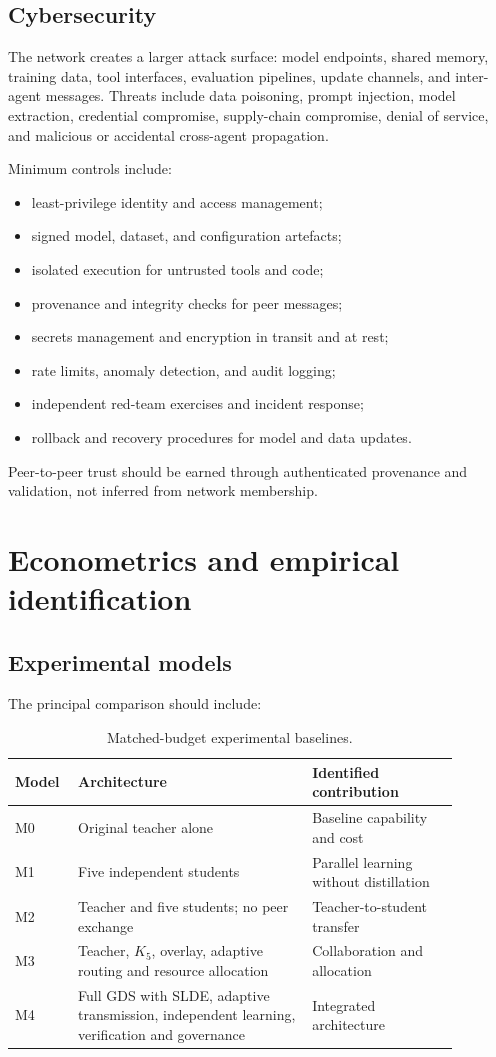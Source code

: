 \documentclass[11pt,a4paper]{article}
\begin{document}
\subsection{Cybersecurity}

The network creates a larger attack surface: model endpoints, shared memory, training data, tool interfaces, evaluation pipelines, update channels, and inter-agent messages. Threats include data poisoning, prompt injection, model extraction, credential compromise, supply-chain compromise, denial of service, and malicious or accidental cross-agent propagation.

Minimum controls include:
\begin{itemize}
\item least-privilege identity and access management;
\item signed model, dataset, and configuration artefacts;
\item isolated execution for untrusted tools and code;
\item provenance and integrity checks for peer messages;
\item secrets management and encryption in transit and at rest;
\item rate limits, anomaly detection, and audit logging;
\item independent red-team exercises and incident response;
\item rollback and recovery procedures for model and data updates.
\end{itemize}
Peer-to-peer trust should be earned through authenticated provenance and validation, not inferred from network membership.

\section{Econometrics and empirical identification}

\subsection{Experimental models}

The principal comparison should include:
\begin{table}[ht]
\centering
\small
\begin{tabular}{p{0.10\linewidth}p{0.48\linewidth}p{0.30\linewidth}}
\toprule
Model & Architecture & Identified contribution\\
\midrule
M0 & Original teacher alone & Baseline capability and cost\\
M1 & Five independent students & Parallel learning without distillation\\
M2 & Teacher and five students; no peer exchange & Teacher-to-student transfer\\
M3 & Teacher, \(K_5\), overlay, adaptive routing and resource allocation & Collaboration and allocation\\
M4 & Full GDS with SLDE, adaptive transmission, independent learning, verification and governance & Integrated architecture\\
\bottomrule
\end{tabular}
\caption{Matched-budget experimental baselines.}
\end{table}
\end{document}
